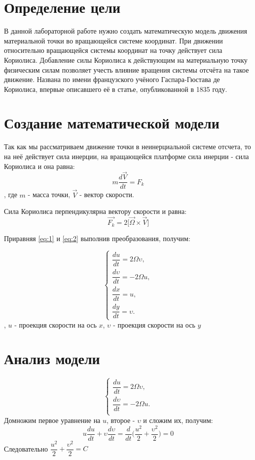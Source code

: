 \documentclass[a4paper, 14pt]{extarticle}
\begin{document}
	\pagebreak	

	\section{Определение цели}
		В данной лабораторной работе нужно создать математическую модель движения материальной точки во вращающейся системе координат. При движении относительно вращающейся системы координат на точку действует сила Кориолиса. Добавление силы Кориолиса к действующим на материальную точку физическим силам позволяет учесть влияние вращения системы отсчёта на такое движение. Названа по имени французского учёного Гаспара-Гюстава де Кориолиса, впервые описавшего её в статье, опубликованной в 1835 году.

	\section{Создание математической модели}
		Так как мы рассматриваем движение точки в неинерциальной системе отсчета, то на неё действует сила  инерции, на вращающейся платформе сила инерции - сила Кориолиса и она равна:
		\[ m\dfrac{d\vec{V}}{dt} = F_k \tag{1} \label{eq:1} \], где
		$m$ - масса точки, $\vec{V}$ - вектор скорости.
		
		Сила Кориолиса перпендикулярна вектору скорости и равна:
		\[ \vec{F_k} = 2 \Big[\vec{\Omega}\times\vec{V}\Big] \tag{2} \label{eq:2} \]
		
		Приравняя \eqref{eq:1} и \eqref{eq:2} выполнив преобразования, получим:
		
		\[\begin{cases}
			\dfrac{du}{dt} = 2\Omega\upsilon,\\
			\dfrac{d\upsilon}{dt} = -2\Omega u,\\
			\dfrac{dx}{dt} = u,\\
			\dfrac{dy}{dt} = \upsilon.
		\end{cases}\],
		$u$ - проекция скорости на ось $x$, $\upsilon$ - проекция скорости на ось $y$
		
	\section{Анализ модели}
		\[\begin{cases}
			\dfrac{du}{dt} = 2\Omega\upsilon,\\
			\dfrac{d\upsilon}{dt} = -2\Omega u.\\
		\end{cases}\]
		Домножим первое уравнение на $u$, второе - $\upsilon$  и сложим их, получим:
		\[u\dfrac{du}{dt} + \upsilon\dfrac{d\upsilon}{dt} = \dfrac{d}{dt}\Bigg( \dfrac{u^2}{2} + \dfrac{\upsilon^2}{2} \Bigg) = 0 \]
		Следовательно $ \dfrac{u^2}{2} + \dfrac{\upsilon^2}{2} = C$
	
\end{document}
